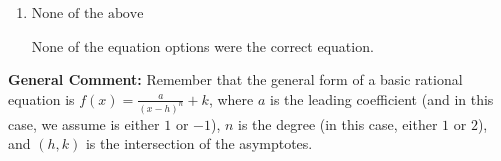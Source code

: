 \documentclass{extbook}[14pt]
\begin{document}
\begin{enumerate}
{\begin{enumerate}[label=\Alph*.]
Corresponds to thinking the graph was a shifted version of $\frac{1}{x^2}$, using the general form $f(x) = \frac{a}{x-h}+k$, the opposite leading coefficient, AND not noticing the $y$-value was wrong.
\item \( \text{None of the above} \)

None of the equation options were the correct equation.
\end{enumerate}

\textbf{General Comment:} Remember that the general form of a basic rational equation is $ f(x) = \frac{a}{(x-h)^n} + k$, where $a$ is the leading coefficient (and in this case, we assume is either $1$ or $-1$), $n$ is the degree (in this case, either $1$ or $2$), and $(h, k)$ is the intersection of the asymptotes.
}
\end{enumerate}
\end{document}
